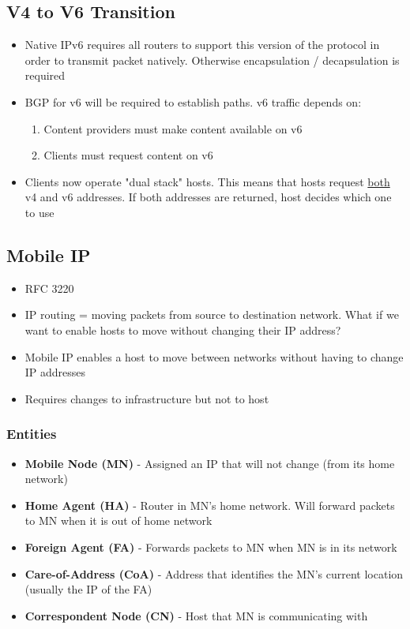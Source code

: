\documentclass[11pt]{article}
\begin{document}
\subsection{V4 to V6 Transition}
\label{sec:orgheadline112}
\begin{itemize}
\item Native IPv6 requires all routers to support this version of the
protocol in order to transmit packet natively. Otherwise
encapsulation / decapsulation is required
\item BGP for v6 will be required to establish paths. v6 traffic depends
on:
\begin{enumerate}
\item Content providers must make content available on v6
\item Clients must request content on v6
\end{enumerate}
\item Clients now operate "dual stack" hosts. This means that hosts
request \uline{both} v4 and v6 addresses. If both addresses are returned,
host decides which one to use
\end{itemize}

\subsection{Mobile IP}
\label{sec:orgheadline116}
\begin{itemize}
\item RFC 3220
\item IP routing = moving packets from source to destination network. What
if we want to enable hosts to move without changing their IP
address?
\item Mobile IP enables a host to move between networks without having to
change IP addresses
\item Requires changes to infrastructure but not to host
\end{itemize}

\subsubsection{Entities}
\label{sec:orgheadline113}
\begin{itemize}
\item \textbf{Mobile Node (MN)} - Assigned an IP that will not change (from its
home network)
\item \textbf{Home Agent (HA)} - Router in MN's home network. Will forward
packets to MN when it is out of home network
\item \textbf{Foreign Agent (FA)} - Forwards packets to MN when MN is in its
network
\item \textbf{Care-of-Address (CoA)} - Address that identifies the MN's current
location (usually the IP of the FA)
\item \textbf{Correspondent Node (CN)}  - Host that MN is communicating with
\end{itemize}
\end{document}
